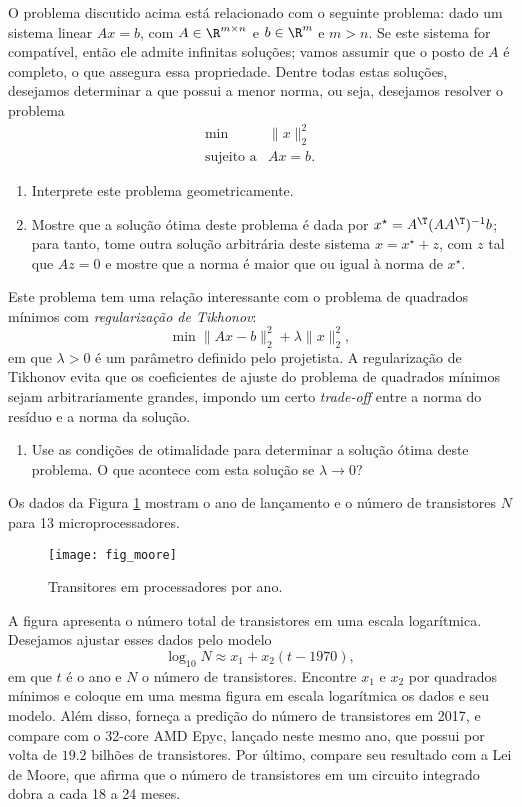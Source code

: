 \begin{problem}
O problema discutido acima está relacionado com o seguinte problema: dado um sistema linear $Ax = b$, com $A \in \R^{m \times n}$ e $b \in \R^m$ e $m > n$. Se este sistema for compatível, então ele admite infinitas soluções; vamos assumir que o posto de $A$ é completo, o que assegura essa propriedade. Dentre todas estas soluções, desejamos determinar a que possui a menor norma, ou seja, desejamos resolver o problema
\[
\begin{array}{rl}
\min & \|x\|_2^2\\
\textrm{sujeito a} & Ax = b.
\end{array}
\]
\begin{enumerate}[label=(\alph*),series=tik]
\item Interprete este problema geometricamente.
\item Mostre que a solução ótima deste problema é dada por $x^\star = A^\T (AA^\T)^{-1}b$; para tanto, tome outra solução arbitrária deste sistema $x = x^\star + z$, com $z$ tal que $Az = 0$ e mostre que a norma é maior que ou igual à norma de $x^\star$.
\end{enumerate}
Este problema tem uma relação interessante com o problema de quadrados mínimos com {\em regularização de Tikhonov}:
\[
\min \|Ax - b\|_2^2 + \lambda \|x\|_2^2,
\]
em que $\lambda > 0$ é um parâmetro definido pelo projetista. A regularização de Tikhonov evita que os coeficientes de ajuste do problema de quadrados mínimos sejam arbitrariamente grandes, impondo um certo {\em trade-off} entre a norma do resíduo e a norma da solução.
\begin{enumerate}[resume*=tik]
\item Use as condições de otimalidade para determinar a solução ótima deste problema. O que acontece com esta solução se $\lambda \to 0$?
\end{enumerate}
\end{problem}

\begin{problem} Os dados da Figura \ref{fig_moore} mostram o ano de lançamento e o número de transistores $N$ para 13 microprocessadores.
\begin{figure}[tb]
\centering
\texttt{[image: fig\_moore]}
\caption{Transitores em processadores por ano.}\label{fig_moore}
\end{figure}
A figura apresenta o número total de transistores em uma escala logarítmica. Desejamos ajustar esses dados pelo modelo
\[
\log_{10}N \approx x_1 + x_2(t-1970),
\]
em que $t$ é o ano e $N$ o número de transistores. Encontre $x_1$ e $x_2$ por quadrados mínimos e coloque em uma mesma figura em escala logarítmica os dados e seu modelo. Além disso, forneça a predição do número de transistores em 2017, e compare com o 32-core AMD Epyc, lançado neste mesmo ano, que possui por volta de $19.2$ bilhões de transistores. Por último, compare seu resultado com a Lei de Moore, que afirma que o número de transistores em um circuito integrado dobra a cada 18 a 24 meses.
\end{problem}

